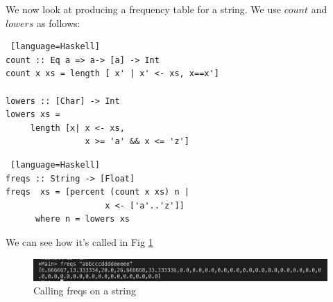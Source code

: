 \documentclass{beamer}
\def\frametitle#1{}
\begin{document}
\begin{frame}[fragile, label=freq2]
  \frametitle{Frequency Tables cont. } 
  We now look at producing a frequency table for a string. We use $count$ and $lowers$ as follows:
    \begin{onlyenv}
  \begin{lstlisting} [language=Haskell]
count :: Eq a => a-> [a] -> Int
count x xs = length [ x' | x' <- xs, x==x'] 

lowers :: [Char] -> Int
lowers xs = 
     length [x| x <- xs, 
                x >= 'a' && x <= 'z'] 
\end{lstlisting}
 \end{onlyenv}    
\end{frame}


\begin{frame}[fragile, label=freq3]
  \frametitle{Frequency Tables cont. } 
     \begin{onlyenv}
  \begin{lstlisting} [language=Haskell]
freqs :: String -> [Float]
freqs  xs = [percent (count x xs) n | 
                    x <- ['a'..'z']]
      where n = lowers xs
\end{lstlisting}
 \end{onlyenv}    
\pagebreak
  We can see how it's called in Fig \ref{freqs}
  \begin{figure}
			\centering
			\includegraphics[page=1,width=.9\textwidth]{img/03.png}
			\caption{Calling freqs on a string}
			\label{freqs}
		\end{figure}
\end{frame}
\end{document}
